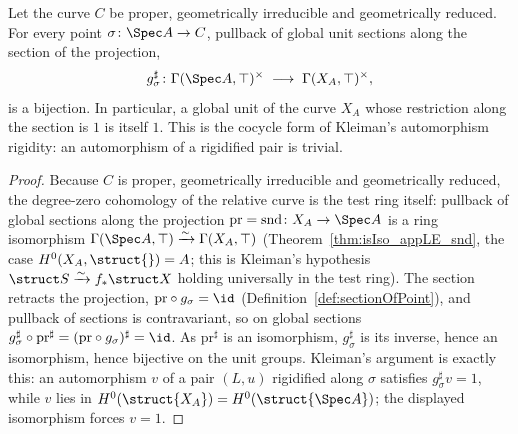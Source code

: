\begin{theorem}
  \label{thm:unitsAppTop_sectionOfPoint_bijective}
  \leanok
  Let the curve \(C\) be proper, geometrically irreducible and geometrically reduced. For every
  point \(\sigma \colon \Spec A \to C\), pullback of global unit sections along the section of the
  projection,
  \[
    g_\sigma^{\sharp} \colon \Gamma(\Spec A, \top)^{\times}
      \;\longrightarrow\; \Gamma(X_A, \top)^{\times},
  \]
  is a bijection. In particular, a global unit of the curve \(X_A\) whose restriction along the
  section is \(1\) is itself \(1\). This is the cocycle form of Kleiman's automorphism rigidity: an
  automorphism of a rigidified pair is trivial.
\end{theorem}
\begin{proof}
  \leanok
  Because \(C\) is proper, geometrically irreducible and geometrically reduced, the degree-zero
  cohomology of the relative curve is the test ring itself: pullback of global sections along the
  projection \(\mathrm{pr} = \mathrm{snd} \colon X_A \to \Spec A\) is a ring isomorphism
  \(\Gamma(\Spec A, \top) \xrightarrow{\sim} \Gamma(X_A, \top)\)
  (Theorem~\ref{thm:isIso_appLE_snd}, the case \(H^0(X_A, \struct{}) = A\); this is Kleiman's
  hypothesis \(\struct S \xrightarrow{\sim} f_{*}\struct X\) holding universally in the test ring).
  The section retracts the projection, \(\mathrm{pr} \circ g_\sigma = \id\)
  (Definition~\ref{def:sectionOfPoint}), and pullback of sections is contravariant, so on global
  sections \(g_\sigma^{\sharp} \circ \mathrm{pr}^{\sharp} = (\mathrm{pr} \circ g_\sigma)^{\sharp} =
  \id\). As \(\mathrm{pr}^{\sharp}\) is an isomorphism, \(g_\sigma^{\sharp}\) is its inverse, hence
  an isomorphism, hence bijective on the unit groups. Kleiman's argument is exactly this: an
  automorphism \(v\) of a pair \((L, u)\) rigidified along \(\sigma\) satisfies
  \(g_\sigma^{\sharp} v = 1\), while \(v\) lies in \(H^0(\struct{X_A}) = H^0(\struct{\Spec A})\); the
  displayed isomorphism forces \(v = 1\).
\end{proof}

